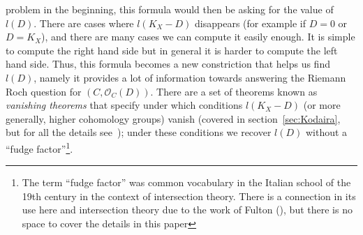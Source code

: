 \documentclass{ut-thesis}
\newcommand{\CO}{{\mathcal{O}}}
\begin{document}
problem in the beginning, this formula would then be asking for the value of $l(D)$. There are cases where
$l(K_X-D)$ disappears (for example if $D = 0$ or $D = K_X$), and there are many cases we can compute it easily
enough. It is simple to compute the right hand side but in general it is harder to compute the left hand
side. Thus, this formula becomes a new constriction that helps us find $l(D)$, namely it provides a lot of
information towards answering the Riemann Roch question for $(C, \CO_C(D))$. There are a set of theorems known
as \emph{vanishing theorems} that specify under which conditions $l(K_X-D)$ (or more generally, higher
cohomology groups) vanish (covered in section~\ref{sec:Kodaira}, but for all the details
see~\cite{deligneRelevementsModulop2etDecomposition1987}); under these conditions we recover $l(D)$ without a
``fudge factor''\footnote{The term ``fudge factor'' was common vocabulary in the Italian school of the 19th
century in the context of intersection theory. There is a connection in its use here and intersection theory
due to the work of Fulton (\cite{fultonIntersectionTheory1984}), but there is no space to cover the details
in this paper}.
\end{document}
